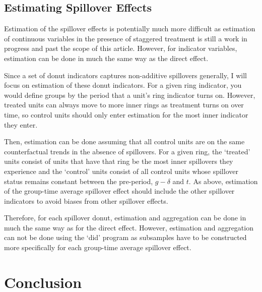 \documentclass[11pt]{article}
\begin{document}
\subsection{Estimating Spillover Effects}

Estimation of the spillover effects is potentially much more difficult as estimation of continuous variables in the presence of staggered treatment is still a work in progress and past the scope of this article. However, for indicator variables, estimation can be done in much the same way as the direct effect. 

Since a set of donut indicators captures non-additive spillovers generally, I will focus on estimation of these donut indicators. For a given ring indicator, you would define groups by the period that a unit's ring indicator turns on. However, treated units can always move to more inner rings as treatment turns on over time, so control units should only enter estimation for the most inner indicator they enter. 

Then, estimation can be done assuming that all control units are on the same counterfactual trends in the absence of spillovers. For a given ring, the `treated' units consist of units that have that ring be the most inner spillovers they experience and the `control' units consist of all control units whose spillover status remains constant between the pre-period, $g - \delta$ and $t$. As above, estimation of the group-time average spillover effect should include the other spillover indicators to avoid biases from other spillover effects. 

Therefore, for each spillover donut, estimation and aggregation can be done in much the same way as for the direct effect. However, estimation and aggregation can not be done using the `did' program as subsamples have to be constructed more specifically for each group-time average spillover effect. 







\section{Conclusion}
\label{sec:conclusion}
\end{document}
